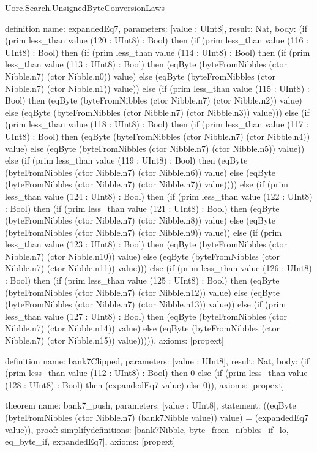 \begin{lexlean}{Uorc.Search.UnsignedByteConversionLaws}
\begin{semanticmodule}
definition{
  name: expandedEq7,
  parameters: [value : UInt8],
  result: Nat,
  body: (if (prim less_than value (120 : UInt8) : Bool) then (if (prim less_than value (116 : UInt8) : Bool) then (if (prim less_than value (114 : UInt8) : Bool) then (if (prim less_than value (113 : UInt8) : Bool) then (eqByte (byteFromNibbles (ctor Nibble.n7) (ctor Nibble.n0)) value) else (eqByte (byteFromNibbles (ctor Nibble.n7) (ctor Nibble.n1)) value)) else (if (prim less_than value (115 : UInt8) : Bool) then (eqByte (byteFromNibbles (ctor Nibble.n7) (ctor Nibble.n2)) value) else (eqByte (byteFromNibbles (ctor Nibble.n7) (ctor Nibble.n3)) value))) else (if (prim less_than value (118 : UInt8) : Bool) then (if (prim less_than value (117 : UInt8) : Bool) then (eqByte (byteFromNibbles (ctor Nibble.n7) (ctor Nibble.n4)) value) else (eqByte (byteFromNibbles (ctor Nibble.n7) (ctor Nibble.n5)) value)) else (if (prim less_than value (119 : UInt8) : Bool) then (eqByte (byteFromNibbles (ctor Nibble.n7) (ctor Nibble.n6)) value) else (eqByte (byteFromNibbles (ctor Nibble.n7) (ctor Nibble.n7)) value)))) else (if (prim less_than value (124 : UInt8) : Bool) then (if (prim less_than value (122 : UInt8) : Bool) then (if (prim less_than value (121 : UInt8) : Bool) then (eqByte (byteFromNibbles (ctor Nibble.n7) (ctor Nibble.n8)) value) else (eqByte (byteFromNibbles (ctor Nibble.n7) (ctor Nibble.n9)) value)) else (if (prim less_than value (123 : UInt8) : Bool) then (eqByte (byteFromNibbles (ctor Nibble.n7) (ctor Nibble.n10)) value) else (eqByte (byteFromNibbles (ctor Nibble.n7) (ctor Nibble.n11)) value))) else (if (prim less_than value (126 : UInt8) : Bool) then (if (prim less_than value (125 : UInt8) : Bool) then (eqByte (byteFromNibbles (ctor Nibble.n7) (ctor Nibble.n12)) value) else (eqByte (byteFromNibbles (ctor Nibble.n7) (ctor Nibble.n13)) value)) else (if (prim less_than value (127 : UInt8) : Bool) then (eqByte (byteFromNibbles (ctor Nibble.n7) (ctor Nibble.n14)) value) else (eqByte (byteFromNibbles (ctor Nibble.n7) (ctor Nibble.n15)) value))))),
  axioms: [propext]
}

definition{
  name: bank7Clipped,
  parameters: [value : UInt8],
  result: Nat,
  body: (if (prim less_than value (112 : UInt8) : Bool) then 0 else (if (prim less_than value (128 : UInt8) : Bool) then (expandedEq7 value) else 0)),
  axioms: [propext]
}

theorem{
  name: bank7_push,
  parameters: [value : UInt8],
  statement: ((eqByte (byteFromNibbles (ctor Nibble.n7) (bank7Nibble value)) value) = (expandedEq7 value)),
  proof: simplify{definitions: [bank7Nibble, byte_from_nibbles_if_lo, eq_byte_if, expandedEq7]},
  axioms: [propext]
}


\end{semanticmodule}
\end{lexlean}
